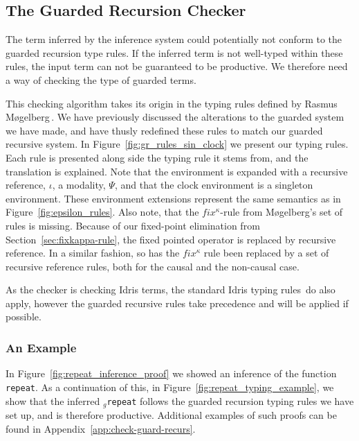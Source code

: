 \subsection{The Guarded Recursion Checker}
\label{sec:guard-recurs-check}
The term inferred by the inference system could potentially not conform to the
guarded recursion type rules. If the inferred term is not well-typed within
these rules, the input term can not be guaranteed to be productive. We
therefore need a way of checking the type of guarded terms.

This checking algorithm takes its origin in the typing rules defined by Rasmus
M\o gelberg\,\citep{Mogelberg:2014}. We have previously discussed the alterations
to the guarded system we have made, and have thusly redefined these rules to
match our guarded recursive system. In Figure~\ref{fig:gr_rules_sin_clock} we
present our typing rules. Each rule is presented along side the typing rule it
stems from, and the translation is explained. Note that the
environment is expanded with a recursive reference, $\iota$, a modality, $\Psi$,
and that the clock environment is a singleton environment. These environment extensions
represent the same semantics as in Figure~\ref{fig:epsilon_rules}. Also note,
that the $fix^\kappa$-rule from M\o gelberg's set of rules is missing. Because of our
fixed-point elimination from Section~\ref{sec:fixkappa-rule}, the fixed pointed
operator is replaced by recursive reference. In a similar fashion, so has the
$fix^\kappa$ rule been replaced by a set of recursive reference rules, both for
the causal and the non-causal case.

As the checker is checking Idris terms, the standard Idris typing
rules\,\citep{BradyIdrisImpl13} do also apply, however the guarded recursive
rules take precedence and will be applied if possible.


\subsubsection{An Example}
In Figure~\ref{fig:repeat_inference_proof} we showed an inference of the
function \texttt{repeat}. As a continuation of this, in Figure~\ref{fig:repeat_typing_example}, we show that the inferred
$_g$\texttt{repeat} follows the guarded recursion typing rules we have set up, and is therefore
productive. Additional examples of such proofs can be found in Appendix~\ref{app:check-guard-recurs}.


